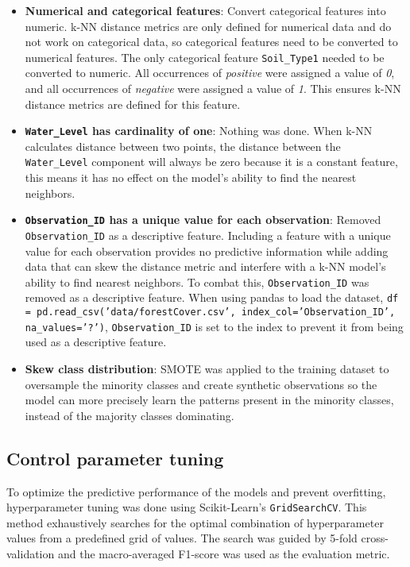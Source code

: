 \documentclass[conference]{IEEEtran}
\begin{document}
\begin{itemize}
    \item \textbf{Numerical and categorical features}: Convert categorical features into numeric. k-NN distance metrics are only defined for numerical data and do not work on categorical data, so categorical features need to be converted to numerical features. The only categorical feature \texttt{Soil\_Type1} needed to be converted to numeric. All occurrences of \textit{positive} were assigned a value of \textit{0}, and all occurrences of \textit{negative} were assigned a value of \textit{1}. This ensures k-NN distance metrics are defined for this feature.
    \item \textbf{\texttt{Water\_Level} has cardinality of one}: Nothing was done. When k-NN calculates distance between two points, the distance between the \texttt{Water\_Level} component will always be zero because it is a constant feature, this means it has no effect on the model's ability to find the nearest neighbors.
    \item \textbf{\texttt{Observation\_ID} has a unique value for each observation}: Removed \texttt{Observation\_ID} as a descriptive feature. Including a feature with a unique value for each observation provides no predictive information while adding data that can skew the distance metric and interfere with a k-NN model's ability to find nearest neighbors. To combat this, \texttt{Observation\_ID} was removed as a descriptive feature. When using pandas to load the dataset, \texttt{df = pd.read\_csv('data/forestCover.csv', index\_col='Observation\_ID', na\_values='?')}, \texttt{Observation\_ID} is set to the index to prevent it from being used as a descriptive feature.
    \item \textbf{Skew class distribution}: SMOTE was applied to the training dataset to oversample the minority classes and create synthetic observations so the model can more precisely learn the patterns present in the minority classes, instead of the majority classes dominating. 
\end{itemize}

\subsection{\textbf{Control parameter tuning}}

To optimize the predictive performance of the models and prevent overfitting, hyperparameter tuning was done using Scikit-Learn's \texttt{GridSearchCV}. This method exhaustively searches for the optimal combination of hyperparameter values from a predefined grid of values. The search was guided by 5-fold cross-validation and the macro-averaged F1-score was used as the evaluation metric.
\end{document}
